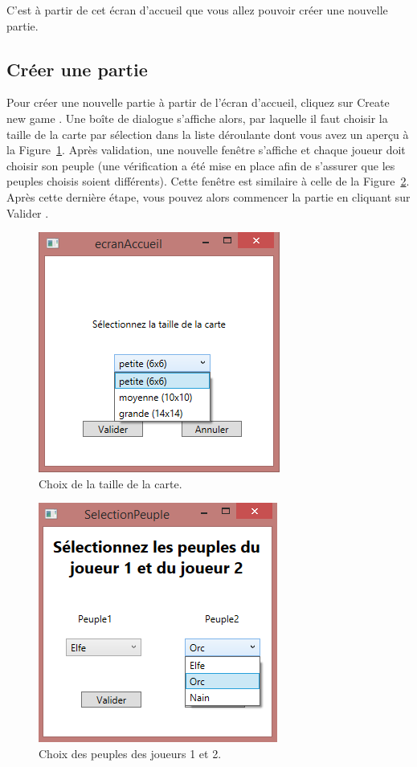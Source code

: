 C'est à partir de cet écran d'accueil que vous allez pouvoir créer une nouvelle partie.

\subsection{Créer une partie}

Pour créer une nouvelle partie à partir de l'écran d'accueil, cliquez sur \og Create new game \fg{}. Une boîte de dialogue s'affiche alors, par laquelle il faut choisir la taille de la carte par sélection dans la liste déroulante dont vous avez un aperçu à la {\sc Figure}~\ref{fig:sizeMap}. Après validation, une nouvelle fenêtre s'affiche et chaque joueur doit choisir son peuple (une vérification a été mise en place afin de s'assurer que les peuples choisis soient différents). Cette fenêtre est similaire à celle de la {\sc Figure}~\ref{fig:choicePeoples}. Après cette dernière étape, vous pouvez alors commencer la partie en cliquant sur \og Valider \fg{}.

\begin{figure}[!h]
    \centering
    \includegraphics[height=0.60\textwidth]{figure/sizeMap.png}
    \caption{Choix de la taille de la carte.}
    \label{fig:sizeMap}
\end{figure}

\begin{figure}[!h]
    \centering
    \includegraphics[height=0.60\textwidth]{figure/choicePeoples.png}
    \caption{Choix des peuples des joueurs 1 et 2.}
    \label{fig:choicePeoples}
\end{figure}

